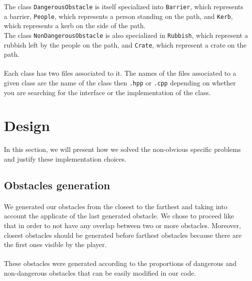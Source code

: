 \documentclass[a4paper, 11pt, oneside]{article}
\begin{document}
The class \texttt{DangerousObstacle} is itself specialized into \texttt{Barrier}, which represents a barrier, \texttt{People}, which represents a person standing on the path, and \texttt{Kerb}, which represents a kerb on the side of the path.\\ \newline
The class \texttt{NonDangerousObstacle} is also specialized in \texttt{Rubbish}, which represent a rubbish left by the people on the path, and \texttt{Crate}, which represent a crate on the path.

\paragraph{}Each class has two files associated to it. The names of the files associated to a given class are the name of the class then \texttt{.hpp} or \texttt{.cpp} depending on whether you are searching for the interface or the implementation of the class.



\section{Design}
\paragraph{}In this section, we will present how we solved the non-obvious specific problems and justify these implementation choices.

\subsection{Obstacles generation}
\paragraph{}We generated our obstacles from the closest to the farthest and taking into account the applicate of the last generated obstacle. We chose to proceed like that in order to not have any overlap between two or more obstacles. Moreover, closest obstacles should be generated before farthest obstacles because there are the first ones visible by the player.
\paragraph{}These obstacles were generated according to the proportions of dangerous and non-dangerous obstacles that can be easily modified in our code.
\end{document}
